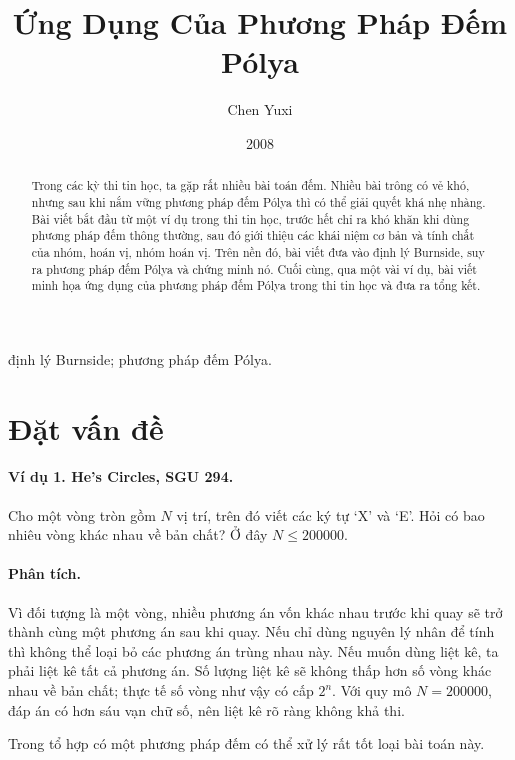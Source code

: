 \documentclass[11pt]{article}
\title{Ứng Dụng Của Phương Pháp Đếm Pólya}
\author{Chen Yuxi}
\date{2008}
\begin{document}
\maketitle


\begin{abstract}
Trong các kỳ thi tin học, ta gặp rất nhiều bài toán đếm. Nhiều bài trông có
vẻ khó, nhưng sau khi nắm vững phương pháp đếm Pólya thì có thể giải quyết
khá nhẹ nhàng. Bài viết bắt đầu từ một ví dụ trong thi tin học, trước hết chỉ
ra khó khăn khi dùng phương pháp đếm thông thường, sau đó giới thiệu các khái
niệm cơ bản và tính chất của nhóm, hoán vị, nhóm hoán vị. Trên nền đó, bài
viết đưa vào định lý Burnside, suy ra phương pháp đếm Pólya và chứng minh nó.
Cuối cùng, qua một vài ví dụ, bài viết minh họa ứng dụng của phương pháp đếm
Pólya trong thi tin học và đưa ra tổng kết.
\end{abstract}

\noindent{} định lý Burnside; phương pháp đếm Pólya.

\section{Đặt vấn đề}

\paragraph{Ví dụ 1. He's Circles, SGU 294.}
Cho một vòng tròn gồm \(N\) vị trí, trên đó viết các ký tự `X' và `E'. Hỏi có
bao nhiêu vòng khác nhau về bản chất? Ở đây \(N\le 200000\).

\paragraph{Phân tích.}
Vì đối tượng là một vòng, nhiều phương án vốn khác nhau trước khi quay sẽ trở
thành cùng một phương án sau khi quay. Nếu chỉ dùng nguyên lý nhân để tính thì
không thể loại bỏ các phương án trùng nhau này. Nếu muốn dùng liệt kê, ta phải
liệt kê tất cả phương án. Số lượng liệt kê sẽ không thấp hơn số vòng khác nhau
về bản chất; thực tế số vòng như vậy có cấp \(2^n\). Với quy mô
\(N=200000\), đáp án có hơn sáu vạn chữ số, nên liệt kê rõ ràng không khả thi.

Trong tổ hợp có một phương pháp đếm có thể xử lý rất tốt loại bài toán này.
\end{document}
